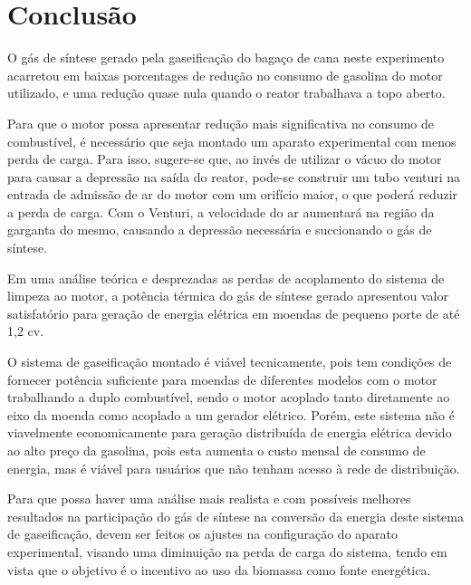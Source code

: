 \chapter[Conclusão]{Conclusão}

O gás de síntese gerado pela gaseificação do bagaço de cana neste experimento acarretou em baixas porcentages de redução no consumo de gasolina do motor utilizado, e uma redução quase nula quando o reator trabalhava a topo aberto.

Para que o motor possa apresentar redução mais significativa no consumo de combustível, é necessário que seja montado um aparato experimental com menos perda de carga. Para isso, sugere-se que, ao invés de utilizar o vácuo do motor para causar a depressão na saída do reator, pode-se construir um tubo venturi na entrada de admissão de ar do motor com um orifício maior, o que poderá reduzir a perda de carga. Com o Venturi, a velocidade do ar aumentará na região da garganta do mesmo, causando a depressão necessária e succionando o gás de síntese.

Em uma análise teórica e desprezadas as perdas de acoplamento do sistema de limpeza ao motor, a potência térmica do gás de síntese gerado apresentou valor satisfatório para geração de energia elétrica em moendas de pequeno porte de até 1,2 cv.

O sistema de gaseificação montado é viável tecnicamente, pois tem condições de fornecer potência suficiente para moendas de diferentes modelos com o motor trabalhando a duplo combustível, sendo o motor acoplado tanto diretamente ao eixo da moenda como acoplado a um gerador elétrico. Porém, este sistema não é viavelmente economicamente para geração distribuída de energia elétrica devido ao alto preço da gasolina, pois esta aumenta o custo mensal de consumo de energia, mas é viável para usuários que não tenham acesso à rede de distribuição.

Para que possa haver uma análise mais realista e com possíveis melhores resultados na participação do gás de síntese na conversão da energia deste sistema de gaseificação, devem ser feitos os ajustes na configuração do aparato experimental, visando uma diminuição na perda de carga do sistema, tendo em vista que o objetivo é o incentivo ao uso da biomassa como fonte energética.